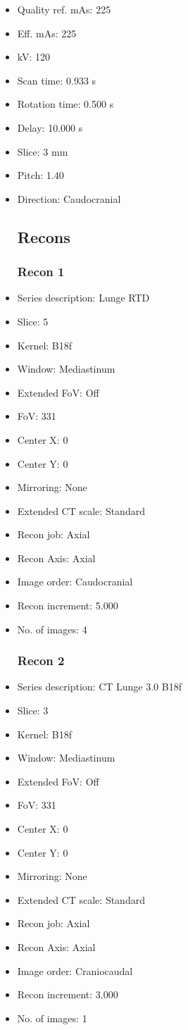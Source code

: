 \documentclass[12pt]{article}
\begin{document}
\begin{itemize}[noitemsep]
\subsection{Scan}
\item Quality ref. mAs: 225\item Eff. mAs: 225\item kV: 120\item Scan time: 0.933 s\item Rotation time: 0.500 s\item Delay: 10.000 s\item Slice: 3 mm\item Pitch: 1.40\item Direction: Caudocranial\subsection{Recons}

\subsubsection{Recon 1}
\item Series description: Lunge RTD
\item Slice: 5
\item Kernel: B18f
\item Window: Mediastinum
\item Extended FoV: Off
\item FoV: 331
\item Center X: 0
\item Center Y: 0
\item Mirroring: None
\item Extended CT scale: Standard
\item Recon job: Axial
\item Recon Axis: Axial
\item Image order: Caudocranial
\item Recon increment: 5.000
\item No. of images: 4
\subsubsection{Recon 2}
\item Series description: CT Lunge 3.0 B18f
\item Slice: 3
\item Kernel: B18f
\item Window: Mediastinum
\item Extended FoV: Off
\item FoV: 331
\item Center X: 0
\item Center Y: 0
\item Mirroring: None
\item Extended CT scale: Standard
\item Recon job: Axial
\item Recon Axis: Axial
\item Image order: Craniocaudal
\item Recon increment: 3.000
\item No. of images: 1

\end{itemize}
\end{document}
